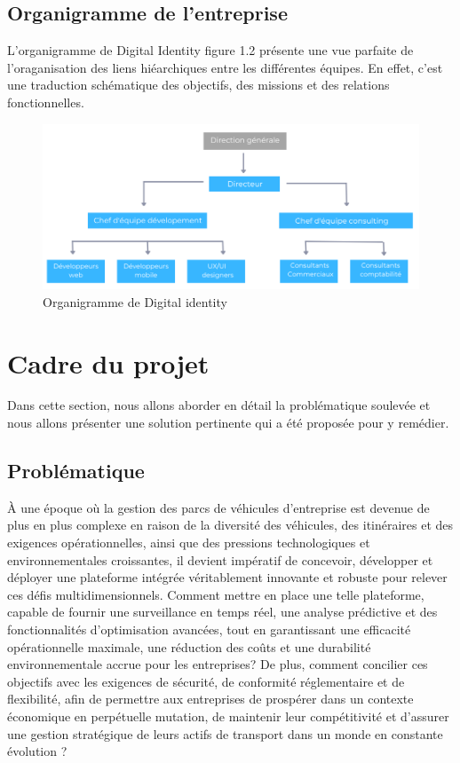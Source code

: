 \subsection{ Organigramme de l’entreprise }
\bigskip
L’organigramme de Digital Identity figure 1.2 présente une vue parfaite de l’oraganisation des
liens hiéarchiques entre les différentes équipes. En effet, c’est une traduction schématique des
objectifs, des missions et des relations fonctionnelles.

\begin{figure}[h]
    \centering
    \includegraphics[scale = 0.65]{chap1.images/digid org.png}
    \caption{Organigramme de Digital identity}
    \label{fig:orgcogecom}
\end{figure}
\newpage
\section{Cadre du projet}
\bigskip
Dans cette section, nous allons aborder en détail la problématique soulevée et nous allons présenter une solution pertinente qui a été proposée pour y remédier.
\bigskip
\subsection{ Problématique}
\bigskip
À une époque où la gestion des parcs de véhicules d'entreprise est devenue de plus en plus complexe en raison de la diversité des véhicules, des itinéraires et des exigences opérationnelles, ainsi que des pressions technologiques et environnementales croissantes, il devient impératif de concevoir, développer et déployer une plateforme intégrée véritablement innovante et robuste pour relever ces défis multidimensionnels. Comment mettre en place une telle plateforme, capable de fournir une surveillance en temps réel, une analyse prédictive et des fonctionnalités d'optimisation avancées, tout en garantissant une efficacité opérationnelle maximale, une réduction des coûts et une durabilité environnementale accrue pour les entreprises? De plus, comment concilier ces objectifs avec les exigences de sécurité, de conformité réglementaire et de flexibilité, afin de permettre aux entreprises de prospérer dans un contexte économique en perpétuelle mutation, de maintenir leur compétitivité et d'assurer une gestion stratégique de leurs actifs de transport dans un monde en constante évolution ?



